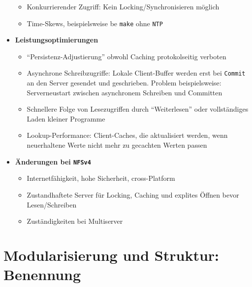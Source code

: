 \begin{itemize}
\begin{itemize}
		\item Konkurrierender Zugriff: Kein Locking/Synchronisieren möglich
		\item Time-Skews, beispielsweise be \texttt{make} ohne \texttt{NTP}
	\end{itemize}
	\item \textbf{Leistungsoptimierungen}
	\begin{itemize}
		\item "`Persistenz-Adjustierung"' obwohl Caching protokolseitig verboten
		\item Asynchrone Schreibzugriffe: Lokale Client-Buffer werden erst bei \texttt{Commit} an den Server gesendet und geschrieben. Problem beispielsweise: Serverneustart zwischen asynchronem Schreiben und Committen
		\item Schnellere Folge von Lesezugriffen durch "`Weiterlesen"' oder vollständiges Laden kleiner Programme
		\item Lookup-Performance: Client-Caches, die aktualisiert werden, wenn neuerhaltene Werte nicht mehr zu gecachten Werten passen
	\end{itemize}
	\item \textbf{Änderungen bei \texttt{NFSv4}}
	\begin{itemize}
		\item Internetfähigkeit, hohe Sicherheit, cross-Platform
		\item Zustandhaftete Server für Locking, Caching und explites Öffnen bevor Lesen/Schreiben
		\item Zuständigkeiten bei Multiserver
	\end{itemize}
\end{itemize}



\section{Modularisierung und Struktur: Benennung}

